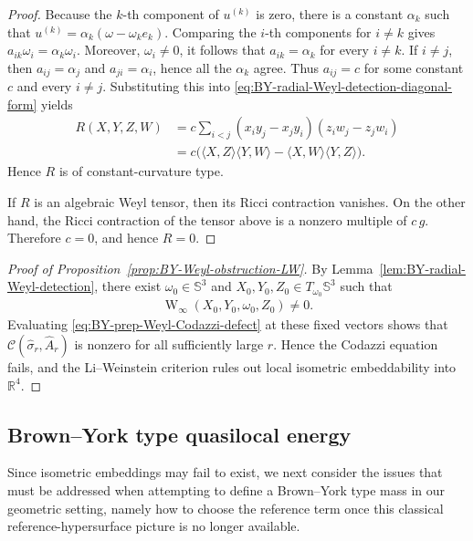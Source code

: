 \documentclass[10pt,a4paper]{amsart}
\newcommand{\R}{\mathbb{R}}
\newcommand{\Sph}{\mathbb{S}}
\newcommand{\Weyl}{\operatorname{W}}
\begin{document}
\begin{proof}
		Because the $k$-th component of $u^{(k)}$ is zero, there is a constant
		$\alpha_k$ such that $u^{(k)}=\alpha_k(\omega-\omega_k e_k)$. Comparing
		the $i$-th components for $i\neq k$ gives
		$a_{ik}\omega_i=\alpha_k\omega_i$. Moreover, $\omega_i\neq0$, it follows
		that $a_{ik}=\alpha_k$ for every $i\neq k$. If $i\neq j$, then $a_{ij}=\alpha_j$ and
		$a_{ji}=\alpha_i$, hence all the $\alpha_k$ agree.
		Thus $a_{ij}=c$ for some constant $c$ and every $i\neq j$. Substituting
		this into \eqref{eq:BY-radial-Weyl-detection-diagonal-form} yields
		\begin{align*}
			R(X,Y,Z,W)
			&=
			c\sum_{i<j}
			(x_i y_j-x_j y_i)
			(z_i w_j-z_j w_i) \\
			&=
			c\bigl(
			\langle X,Z\rangle\langle Y,W\rangle
			-
			\langle X,W\rangle\langle Y,Z\rangle
			\bigr).
		\end{align*}
		Hence $R$ is of constant-curvature type.
		
		If $R$ is an algebraic Weyl tensor, then its Ricci contraction vanishes.
		On the other hand, the Ricci contraction of the tensor above is a
		nonzero multiple of $c\,g$. Therefore $c=0$, and hence $R=0$.
	\end{proof}
	
	
	\begin{proof}[Proof of Proposition~\ref{prop:BY-Weyl-obstruction-LW}]
		By Lemma~\ref{lem:BY-radial-Weyl-detection}, there exist
		$\omega_0\in\Sph^3$ and
		$X_0,Y_0,Z_0\in T_{\omega_0}\Sph^3$ such that
		\begin{align*}
			\Weyl_\infty(X_0,Y_0,\omega_0,Z_0)\neq0.
		\end{align*}
		Evaluating \eqref{eq:BY-prep-Weyl-Codazzi-defect} at these fixed vectors
		shows that $\mathcal C(\hat\sigma_r,\hat A_r)$ is nonzero for all
		sufficiently large $r$.  Hence the Codazzi equation fails, and the
		Li--Weinstein criterion rules out local isometric embeddability into
		$\R^4$.
	\end{proof}
	
	\subsection{Brown--York type quasilocal energy}
	
	Since isometric embeddings may fail to exist, we next consider the issues that must be addressed when attempting to define a Brown--York type mass in our geometric setting, namely how to choose the reference term once this classical
	reference-hypersurface picture is no longer available.
	
\end{document}
